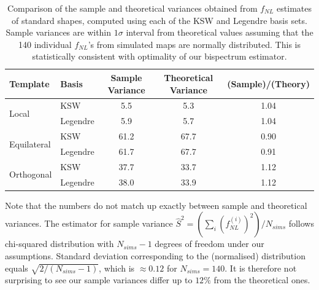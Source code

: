 \begin{table}[h]
	\caption{Comparison of the sample and theoretical variances obtained from $f_{NL}$ estimates of standard shapes, computed using each of the KSW and Legendre basis sets. Sample variances are within $1\sigma$ interval from theoretical values assuming that the 140 individual $f_{NL}$'s from simulated maps are normally distributed. This is statistically consistent with optimality of our bispectrum estimator.}
	\centering
	\label{table:trio_sample_and_theory_variances}
	\renewcommand{\arraystretch}{1.5} 
	\begin{tabular}{llccc}
		\toprule
		Template & Basis & Sample Variance &  Theoretical Variance &  (Sample)/(Theory) \\
		\midrule
		\multirow{2}{*}{Local} & KSW &  5.5 &       5.3 &               1.04 \\
		& Legendre &             5.9 &                  5.7 &               1.04 \\
		\multirow{2}{*}{Equilateral} & KSW &            61.2 &                 67.7 &               0.90 \\
		& Legendre &            61.7 &                 67.7 &               0.91 \\
		\multirow{2}{*}{Orthogonal} & KSW &            37.7 &                 33.7 &               1.12 \\
		& Legendre &            38.0 &                 33.9 &               1.12 \\
		\bottomrule
	\end{tabular}
\end{table}

Note that the numbers do not match up exactly between sample and theoretical variances. The estimator for sample variance $\hat{S}^2 = (\sum_i (f^{(i)}_{NL})^2 )/N_{sims}$ follows chi-squared distribution with $N_{sims}-1$ degrees of freedom under our assumptions. Standard deviation corresponding to the (normalised) distribution equals $\sqrt{2/(N_{sims}-1)}$, which is $\approx 0.12$ for $N_{sims}=140$. It is therefore not surprising to see our sample variances differ up to $12\%$ from the theoretical ones.

